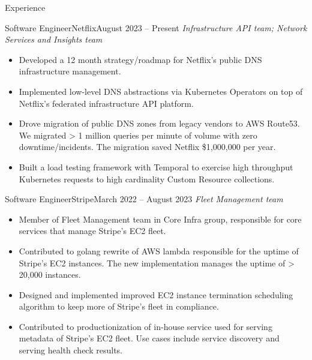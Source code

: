 \documentclass[]{mcdowellcv}
\begin{document}
	\makeheader
	
	
	\begin{cvsection}{Experience}

		\begin{cvsubsection}{Software Engineer}{Netflix}{August 2023 -- Present}
			\emph{Infrastructure API team; Network Services and Insights team}
			\begin{itemize}
				\item Developed a 12 month strategy/roadmap for Netflix's public DNS infrastructure management.
				\item Implemented low-level DNS abstractions via Kubernetes Operators on top of Netflix's federated infrastructure API platform.
				\item Drove migration of public DNS zones from legacy vendors to AWS Route53. We migrated > 1 million queries per minute of volume with zero downtime/incidents. The migration saved Netflix \$1,000,000 per year.
				\item Built a load testing framework with Temporal to exercise high throughput Kubernetes requests to high cardinality Custom Resource collections.
			\end{itemize}
		\end{cvsubsection}

		\begin{cvsubsection}{Software Engineer}{Stripe}{March 2022 -- August 2023}
			\emph{Fleet Management team}
			\begin{itemize}
				\item Member of Fleet Management team in Core Infra group, responsible for core services that manage Stripe's EC2 fleet.
				\item Contributed to golang rewrite of AWS lambda responsible for the uptime of Stripe's EC2 instances. The new implementation manages the uptime of > 20,000 instances.
				\item Designed and implemented improved EC2 instance termination scheduling algorithm to keep more of Stripe's fleet in compliance.
				\item Contributed to productionization of in-house service used for serving metadata of Stripe's EC2 fleet. Use cases include service discovery and serving health check results.
			\end{itemize}
	

\end{cvsubsection}
\end{cvsection}
\end{document}

